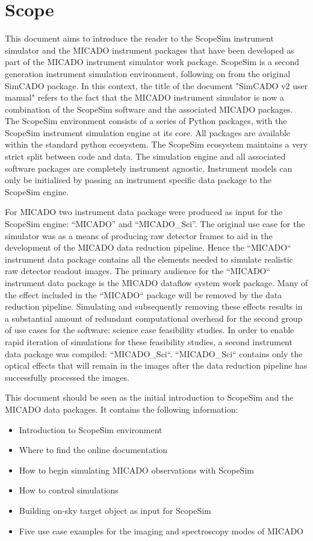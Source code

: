 \section{Scope}
\label{sec:introduction}

This document aims to introduce the reader to the ScopeSim instrument simulator and the MICADO instrument packages that have been developed as part of the MICADO instrument simulator work package.
ScopeSim is a second generation instrument simulation environment, following on from the original SimCADO package.
In this context, the title of the document "SimCADO v2 user manual" refers to the fact that the MICADO instrument simulator is now a combination of the ScopeSim software and the associated MICADO packages.
The ScopeSim environment consists of a series of Python packages, with the ScopeSim instrument simulation engine at its core.
All packages are available within the standard python ecosystem.
The ScopeSim ecosystem maintains a very strict split between code and data.
The simulation engine and all associated software packages are completely instrument agnostic.
Instrument models can only be initialised by passing an instrument specific data package to the ScopeSim engine.

For MICADO two instrument data package were produced as input for the ScopeSim engine: ``MICADO'' and ``MICADO\_Sci''.
The original use case for the simulator was as a means of producing raw detector frames to aid in the development of the MICADO data reduction pipeline.
Hence the ``MICADO`` instrument data package contains all the elements needed to simulate realistic raw detector readout images.
The primary audience for the ``MICADO`` instrument data package is the MICADO dataflow system work package.
Many of the effect included in the ``MICADO`` package will be removed by the data reduction pipeline.
Simulating and subsequently removing these effects results in a substantial amount of redundant computational overhead for the second group of use cases for the software: science case feasibility studies.
In order to enable rapid iteration of simulations for these feasibility studies, a second instrument data package was compiled: ``MICADO\_Sci``.
``MICADO\_Sci`` contains only the optical effects that will remain in the images after the data reduction pipeline has successfully processed the images.

This document should be seen as the initial introduction to ScopeSim and the MICADO data packages.
It contains the following information:
\begin{itemize}
\item Introduction to ScopeSim environment
\item Where to find the online documentation
\item How to begin simulating MICADO observations with ScopeSim
\item How to control simulations
\item Building on-sky target object as input for ScopeSim
\item Five use case examples for the imaging and spectroscopy modes of MICADO
\end{itemize}

